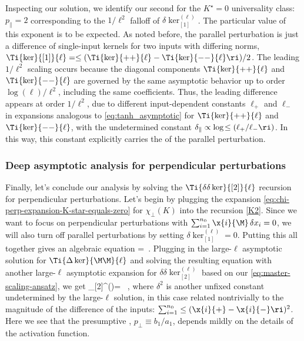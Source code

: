  Inspecting our solution, we identify our second  for the $K^\star=0$ universality class: $p_\parallel = 2$ corresponding to the $1/\ell^2$ falloff of $\delta \ker_{[1]}^{(\ell)}$. The particular value of this exponent is to be expected.
As noted before, the parallel perturbation is just a difference of single-input kernels for two inputs with differing norms, $\Ti{\ker}{[1]}{\ell}=\le(\Ti{\ker}{++}{\ell}-\Ti{\ker}{--}{\ell}\ri)/2$. The leading $1/\ell^2$ scaling occurs because the diagonal components $\Ti{\ker}{++}{\ell}$ and $\Ti{\ker}{--}{\ell}$ are governed by the same asymptotic behavior up to order $\log(\ell)/\ell^2$, including the same coefficients. Thus, the leading difference appears at order $1/\ell^2$, due to different input-dependent constants $\ell_+$ and $\ell_-$ in expansions analogous to \eqref{eq:tanh_asymptotic} for $\Ti{\ker}{++}{\ell}$ and $\Ti{\ker}{--}{\ell}$, with the undetermined constant $\delta_{\parallel}\propto \log\!\le(\ell_{+}/\ell_{-}\ri)$.
In this way, this constant explicitly carries the  of the parallel perturbation.








\subsubsection{Deep asymptotic analysis for perpendicular perturbations}
Finally, let's conclude our analysis by solving the $\Ti{\delta \delta\ker}{[2]}{\ell}$ recursion for perpendicular perturbations. 
Let's begin by plugging the expansion \eqref{eq:chi-perp-expansion-K-star-equals-zero} for $\chi_\perp(K)$ into the recursion \eqref{K2}. Since we want to focus on perpendicular perturbations with $\sum_{i=1}^{n_0}  \x{i}{\M}\, \delta x_i = 0$, we will also turn off parallel perturbations by setting $\delta \ker_{[1]}^{(\ell)}=0$. Putting this all together gives an algebraic equation
\be
{}=\Ti{\delta\delta \ker}{[2]}{\ell}\, .
\ee
Plugging in the large-$\ell$ asymptotic solution for $\Ti{\Delta\ker}{\M\M}{\ell}$ and solving the resulting equation with another large-$\ell$  asymptotic expansion  for $\delta\delta \ker_{[2]}^{(\ell)}$ based on our  \eqref{eq:master-scaling-ansatz},
we get
\be\label{eq:perp-asymptotic-solution}
\delta\delta \ker_{[2]}^{(\ell)}= \,  ,
\ee
where $\delta^2$ is another unfixed constant undetermined by the large-$\ell$ solution, in this case related nontrivially to the magnitude of the difference of the inputs: $\sum_{i=1}^{n_0}\le(\x{i}{+} -  \x{i}{-}\ri)^2$. Here we see that the presumptive , $p_\perp \equiv b_1 / a_1$, depends mildly on the details of the activation function.

